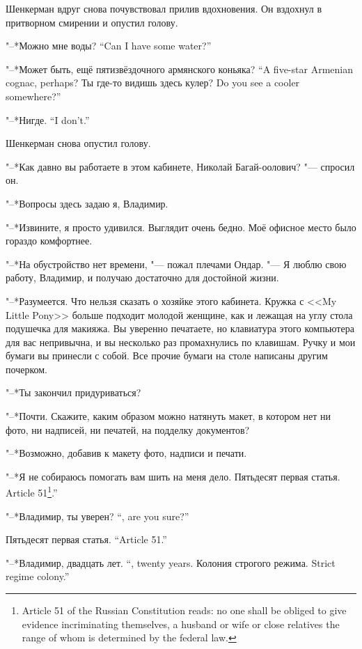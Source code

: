 Шенкерман вдруг снова почувствовал прилив вдохновения.
Он вздохнул в притворном смирении и опустил голову.

{"--*Можно мне воды?}
{``Can I have some water?''}

{"--*Может быть, ещё пятизвёздочного армянского коньяка?}
{``A five-star Armenian cognac, perhaps?}
{Ты где-то видишь здесь кулер?}
{Do you see a cooler somewhere?''}

{"--*Нигде.}
{``I don't.''}

Шенкерман снова опустил голову.

"--*Как давно вы работаете в этом кабинете, Николай Багай-оолович? "--- спросил он.

"--*Вопросы здесь задаю я, Владимир.

"--*Извините, я просто удивился.
Выглядит очень бедно.
Моё офисное место было гораздо комфортнее.

"--*На обустройство нет времени, "--- пожал плечами Ондар.
"--- Я люблю свою работу, Владимир, и получаю достаточно для достойной жизни.

"--*Разумеется.
Что нельзя сказать о хозяйке этого кабинета.
Кружка с <<My Little Pony>> больше подходит молодой женщине, как и лежащая на углу стола подушечка для макияжа.
Вы уверенно печатаете, но клавиатура этого компьютера для вас непривычна, и вы несколько раз промахнулись по клавишам.
Ручку и мои бумаги вы принесли с собой.
Все прочие бумаги на столе написаны другим почерком.

"--*Ты закончил придуриваться?

"--*Почти.
Скажите, каким образом можно натянуть макет, в котором нет ни фото, ни надписей, ни печатей, на подделку документов?

"--*Возможно, добавив к макету фото, надписи и печати.

"--*Я не собираюсь помогать вам шить на меня дело.
{Пятьдесят первая статья.}
{Article 51\footnote{Article 51 of the Russian Constitution reads: no one shall be obliged to give evidence incriminating themselves, a husband or wife or close relatives the range of whom is determined by the federal law.}.''}

{"--*Владимир, ты уверен?}
{``\Vladimir, are you sure?''}

{Пятьдесят первая статья.}
{``Article 51.''}

{"--*Владимир, двадцать лет.}
{``\Vladimir, twenty years.}
{Колония строгого режима.}
{Strict regime colony.''}


